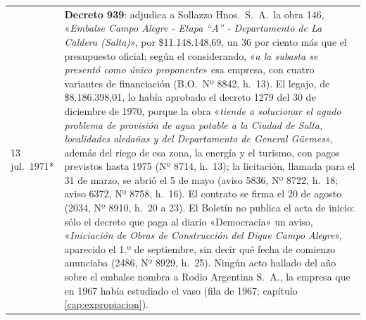 \begin{longtable}{@{}p{2.7cm}p{10.3cm}@{}}
13 jul.\ 1971* & \textbf{Decreto 939}: adjudica a Sollazzo Hnos.\ S.\ A.\ la obra 146, «\textit{Embalse Campo Alegre - Etapa ``A'' - Departamento de La Caldera (Salta)}», por \$11.148.148,69, un 36 por ciento más que el presupuesto oficial; según el considerando, «\textit{a la subasta se presentó como único proponente}» esa empresa, con cuatro variantes de financiación (B.O.\ Nº 8842, h.\ 13). El legajo, de \$8.186.398,01, lo había aprobado el decreto 1279 del 30 de diciembre de 1970, porque la obra «\textit{tiende a solucionar el agudo problema de provisión de agua potable a la Ciudad de Salta, localidades aledañas y del Departamento de General Güemes}», además del riego de esa zona, la energía y el turismo, con pagos previstos hasta 1975 (Nº 8714, h.\ 13); la licitación, llamada para el 31 de marzo, se abrió el 5 de mayo (aviso 5836, Nº 8722, h.\ 18; aviso 6372, Nº 8758, h.\ 16). El contrato se firma el 20 de agosto (2034, Nº 8910, h.\ 20 a 23). El Boletín no publica el acta de inicio: sólo el decreto que paga al diario «Democracia» un aviso, «\textit{Iniciación de Obras de Construcción del Dique Campo Alegre}», aparecido el 1.º de septiembre, sin decir qué fecha de comienzo anunciaba (2486, Nº 8929, h.\ 25). Ningún acto hallado del año sobre el embalse nombra a Rodio Argentina S.\ A., la empresa que en 1967 había estudiado el vaso (fila de 1967; capítulo \ref{cap:expropiacion}). \\

\end{longtable}
